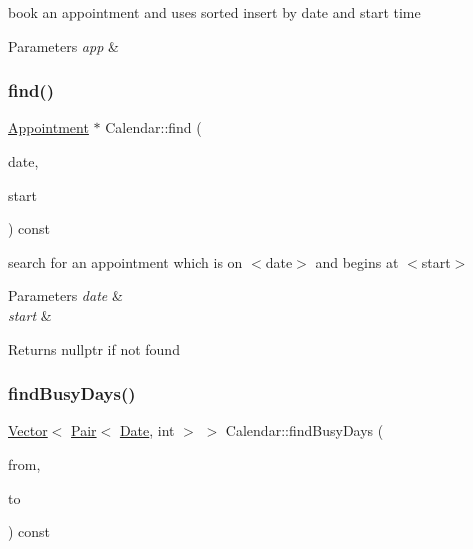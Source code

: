 book an appointment and uses sorted insert by date and start time 
\begin{DoxyParams}{Parameters}
{\em app} & \\
\hline
\end{DoxyParams}
\mbox{\label{classCalendar_a249805cf48297698e30512ff9a47bac3}} 
\subsubsection{\texorpdfstring{find()}{find()}}
{\footnotesize\ttfamily \hyperlink{classAppointment}{Appointment} $\ast$ Calendar\+::find (\begin{DoxyParamCaption}\item[{\hyperlink{classDate}{Date} const \&}]{date,  }\item[{\hyperlink{classTime}{Time} const \&}]{start }\end{DoxyParamCaption}) const}

search for an appointment which is on $<$date$>$ and begins at $<$start$>$ 
\begin{DoxyParams}{Parameters}
{\em date} & \\
\hline
{\em start} & \\
\hline
\end{DoxyParams}
\begin{DoxyReturn}{Returns}
nullptr if not found 
\end{DoxyReturn}
\mbox{\label{classCalendar_a33727e15bb2186dbdc1fe227dfa0a6e6}} 
\subsubsection{\texorpdfstring{find\+Busy\+Days()}{findBusyDays()}}
{\footnotesize\ttfamily \hyperlink{classVector}{Vector}$<$ \hyperlink{structPair}{Pair}$<$ \hyperlink{classDate}{Date}, int $>$ $>$ Calendar\+::find\+Busy\+Days (\begin{DoxyParamCaption}\item[{\hyperlink{classDate}{Date} const \&}]{from,  }\item[{\hyperlink{classDate}{Date} const \&}]{to }\end{DoxyParamCaption}) const}

